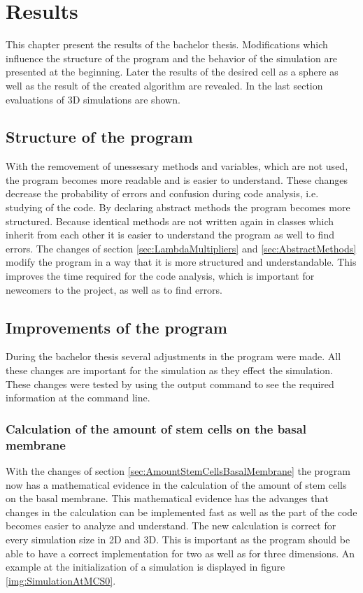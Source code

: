 \chapter{Results}
This chapter present the results of the bachelor thesis. Modifications which influence the structure of the program and the behavior of the simulation are presented at the beginning. Later the results of the desired cell as a sphere as well as the result of the created algorithm are revealed. In the last section evaluations of 3D simulations are shown.

\section{Structure of the program}
With the removement of unessesary methods and variables, which are not used, the program becomes more readable and is easier to understand. These changes decrease the probability of errors and confusion during code analysis, i.e. studying of the code. By declaring abstract methods the program becomes more structured. Because identical methods are not written again in classes which inherit from each other it is easier to understand the program as well to find errors. \newline
The changes of section \ref{sec:LambdaMultipliers} and \ref{sec:AbstractMethods} modify the program in a way that it is more structured and understandable. This improves the time required for the code analysis, which is important for newcomers to the project, as well as to find errors. 

\section{Improvements of the program}
During the bachelor thesis several adjustments in the program were made. All these changes are important for the simulation as they effect the simulation. These changes were tested by using the output command to see the required information at the command line. 
\subsection{Calculation of the amount of stem cells on the basal membrane}
With the changes of section \ref{sec:AmountStemCellsBasalMembrane} the program now has a mathematical evidence in the calculation of the amount of stem cells on the basal membrane. This mathematical evidence has the advanges that changes in the calculation can be implemented fast as well as the part of the code becomes easier to analyze and understand. The new calculation is correct for every simulation size in 2D and 3D. This is important as the program should be able to have a correct implementation for two as well as for three dimensions. An example at the initialization of a simulation is displayed in figure \ref{img:SimulationAtMCS0}.
